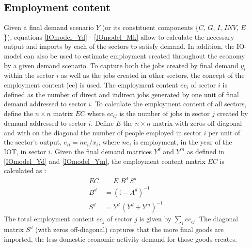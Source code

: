 \documentclass[12pt,english]{article}
\newcommand{\mli}[1]{\mathit{#1}}
\begin{document}
\subsection{Employment content}


Given a final demand scenario $Y$ (or its constituent components \{$C$, $G$, $I$, $\mli{INV}$, $E$\}), equations \ref{IOmodel_Yd} - \ref{IOmodel_Mk} allow to calculate the necessary output and imports by each of the sectors to satisfy demand. In addition, the IO-model can also be used to estimate employment created throughout the economy by a given demand scenario. To capture both the jobs created by final demand $y_i$ %
within the sector $i$ as well as the jobs created in other sectors, the concept of the employment content (ec) is used. The employment content $ec_i$ of sector $i$ is defined as the number of direct and indirect jobs generated by one unit of final demand addressed to %
sector $i$. To calculate the employment content of all sectors, define the $n \times n$ matrix $EC$ where $ec_{ij}$  is the number of jobs in sector $j$ created by demand addressed to sector $i$. Define $E$ the $n\times n$ matrix with zeros off-diagonal and with on the diagonal the number of people employed in sector $i$ per unit of the sector's output, $e_{ii}=ne_i/x_i$, where $ne_i$ is employment, in the year of the IOT, in sector $i$. Given the final demand matrices $Y^d$ and $Y^m$ as defined in \ref{IOmodel_Yd} and \ref{IOmodel_Ym}, the employment content matrix $EC$ is calculated as :
\begin{align}
EC	 &= E\,  \, B^d \, S^d \label{EC} \\ 
B^d &=  (\mathbb{I}-A^d)^{-1} \\
S^d	 &=  Y^d \, (Y^d+Y^m)^{-1}  
\end{align}
The total employment content $ec_j$ of sector $j$ is given by $\sum_i ec_{ij}$. The diagonal matrix $S^d$ (with zeros off-diagonal) captures that the more final goods are imported, the less domestic economic activity demand for those goods creates.
\end{document}
